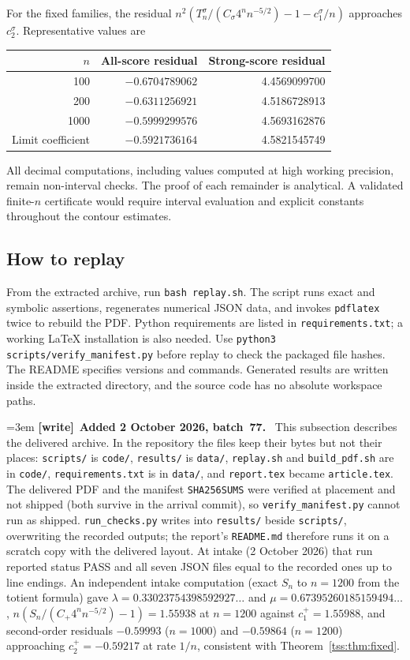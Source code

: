 \documentclass[11pt]{article}
\theoremstyle{remark}\newtheorem{remark}[theorem]{Remark}
\theoremstyle{definition}\newtheorem{definition}[theorem]{Definition}
\newenvironment{writenote}[1][]{\par\smallskip\begingroup\small\emergencystretch=3em
 \noindent\textbf{[write]}\if\relax\detokenize{#1}\relax\else~\textbf{#1.}\fi\ }%
 {\par\endgroup\smallskip}
\begin{document}
For the fixed families, the residual
$n^2(T_n^\sigma/(C_\sigma4^nn^{-5/2})-1-c_1^\sigma/n)$ approaches $c_2^\sigma$. Representative values are
\begin{center}
\begin{tabular}{rrr}
\toprule
$n$&All-score residual&Strong-score residual\\\midrule
100&$-0.6704789062$&4.4569099700\\
200&$-0.6311256921$&4.5186728913\\
1000&$-0.5999299576$&4.5693162876\\
Limit coefficient&$-0.5921736164$&4.5821545749\\
\bottomrule
\end{tabular}
\end{center}
All decimal computations, including values computed at high working precision, remain non-interval checks. The proof of each remainder is analytical. A validated finite-$n$ certificate would require interval evaluation and explicit constants throughout the contour estimates.

\subsection{How to replay}
From the extracted archive, run \texttt{bash replay.sh}. The script runs exact and symbolic assertions, regenerates numerical JSON data, and invokes \texttt{pdflatex} twice to rebuild the PDF. Python requirements are listed in \texttt{requirements.txt}; a working \LaTeX{} installation is also needed. Use \texttt{python3 scripts/verify\_manifest.py} before replay to check the packaged file hashes. The README specifies versions and commands. Generated results are written inside the extracted directory, and the source code has no absolute workspace paths.

\begin{writenote}[Added 2 October 2026, batch~77]
This subsection describes the delivered archive. In the repository the files
keep their bytes but not their places: \texttt{scripts/} is \texttt{code/},
\texttt{results/} is \texttt{data/}, \texttt{replay.sh} and
\texttt{build\_pdf.sh} are in \texttt{code/}, \texttt{requirements.txt} is in
\texttt{data/}, and \texttt{report.tex} became \texttt{article.tex}. The
delivered PDF and the manifest \texttt{SHA256SUMS} were verified at placement
and not shipped (both survive in the arrival commit), so
\texttt{verify\_manifest.py} cannot run as shipped. \texttt{run\_checks.py}
writes into \texttt{results/} beside \texttt{scripts/}, overwriting the
recorded outputs; the report's \texttt{README.md} therefore runs it on a scratch
copy with the delivered layout. At intake (2 October 2026) that run reported
status PASS and all seven JSON files equal to the recorded ones up to line
endings. An independent intake computation (exact $S_n$ to $n=1200$ from the
totient formula) gave $\lambda=0.33023754398592927\ldots$ and
$\mu=0.67395260185159494\ldots$, $n(S_n/(C_+4^nn^{-5/2})-1)=1.55938$ at
$n=1200$ against $c_1^+=1.55988$, and second-order residuals $-0.59993$
($n=1000$) and $-0.59864$ ($n=1200$) approaching $c_2^+=-0.59217$ at rate
$1/n$, consistent with Theorem~\ref{tss:thm:fixed}.
\end{writenote}
\end{document}
